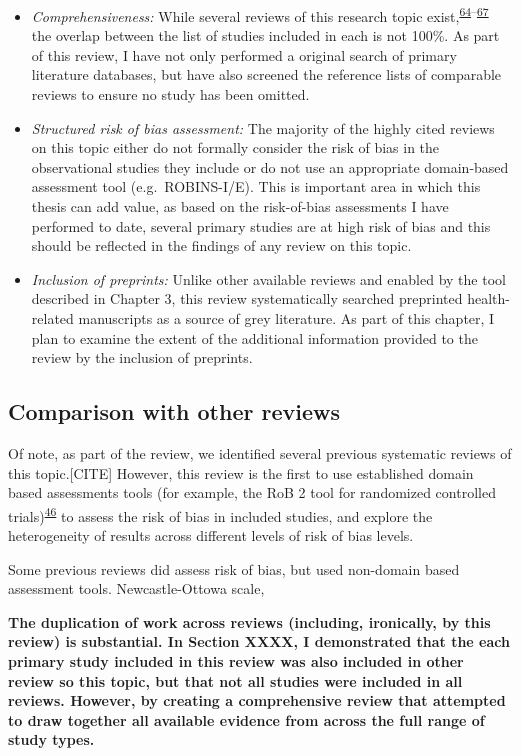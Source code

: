 \documentclass[a4paper, twoside]{templates/ociamthesis}
\providecommand{\tightlist}{%
  \setlength{\itemsep}{0pt}\setlength{\parskip}{0pt}}
\begin{document}
\begin{itemize}
\tightlist
\item
  \emph{Comprehensiveness:} While several reviews of this research topic exist,\textsuperscript{\protect\hyperlink{ref-chu2018b}{64}--\protect\hyperlink{ref-poly2020b}{67}} the overlap between the list of studies included in each is not 100\%. As part of this review, I have not only performed a original search of primary literature databases, but have also screened the reference lists of comparable reviews to ensure no study has been omitted.
\item
  \emph{Structured risk of bias assessment:} The majority of the highly cited reviews on this topic either do not formally consider the risk of bias in the observational studies they include or do not use an appropriate domain-based assessment tool (e.g.~ROBINS-I/E). This is important area in which this thesis can add value, as based on the risk-of-bias assessments I have performed to date, several primary studies are at high risk of bias and this should be reflected in the findings of any review on this topic.
\item
  \emph{Inclusion of preprints:} Unlike other available reviews and enabled by the tool described in Chapter 3, this review systematically searched preprinted health-related manuscripts as a source of grey literature. As part of this chapter, I plan to examine the extent of the additional information provided to the review by the inclusion of preprints.
\end{itemize}

\hypertarget{comparison-with-other-reviews}{%
\subsection{Comparison with other reviews}\label{comparison-with-other-reviews}}

Of note, as part of the review, we identified several previous systematic reviews of this topic.{[}CITE{]} However, this review is the first to use established domain based assessments tools (for example, the RoB 2 tool for randomized controlled trials)\textsuperscript{\protect\hyperlink{ref-sterne2019}{46}} to assess the risk of bias in included studies, and explore the heterogeneity of results across different levels of risk of bias levels.

Some previous reviews did assess risk of bias, but used non-domain based assessment tools. Newcastle-Ottowa scale,

\textbf{The duplication of work across reviews (including, ironically, by this review) is substantial. In Section XXXX, I demonstrated that the each primary study included in this review was also included in other review so this topic, but that not all studies were included in all reviews. However, by creating a comprehensive review that attempted to draw together all available evidence from across the full range of study types.}
\end{document}
